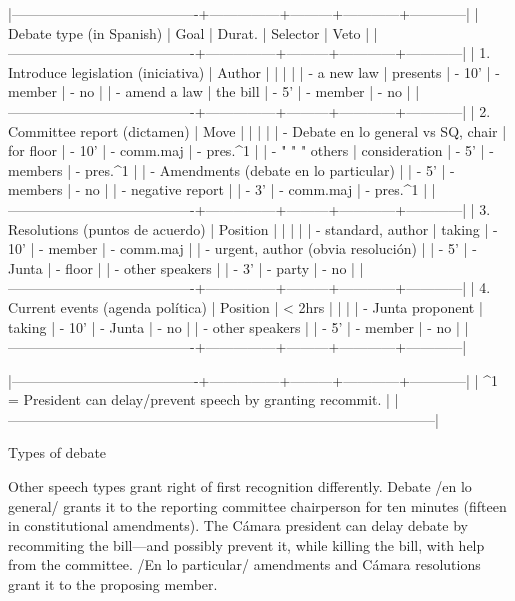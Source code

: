 \begin{table}
|----------------------------------------+---------------+---------+------------+------------|
| Debate type (in Spanish)               | Goal          | Durat.  | Selector   | Veto       |
|----------------------------------------+---------------+---------+------------+------------|
| 1. Introduce legislation (iniciativa)  | Author        |         |            |            |
| - a new law                            | presents      | - 10'   | - member   | - no       |
| - amend a law                          | the bill      | - 5'    | - member   | - no       |
|----------------------------------------+---------------+---------+------------+------------|
| 2. Committee report (dictamen)         | Move          |         |            |            |
| - Debate en lo general vs SQ, chair    | for floor     | - 10'   | - comm.maj | - pres.^1  |
| -   "             "      "   others    | consideration | - 5'    | - members  | - pres.^1  |
| - Amendments (debate en lo particular) |               | - 5'    | - members  | - no       |
| - negative report                      |               | - 3'    | - comm.maj | - pres.^1  |
|----------------------------------------+---------------+---------+------------+------------|
| 3. Resolutions (puntos de acuerdo)     | Position      |         |            |            |
| - standard, author                     | taking        | - 10'   | - member   | - comm.maj |
| - urgent, author (obvia resolución)    |               | - 5'    | - Junta    | - floor    |
| - other speakers                       |               | - 3'    | - party    | - no       |
|----------------------------------------+---------------+---------+------------+------------|
| 4. Current events (agenda política)    | Position      | < 2hrs  |            |            |
| - Junta proponent                      | taking        | - 10'   | - Junta    | - no       |
| - other speakers                       |               | - 5'    | - member   | - no       |
|----------------------------------------+---------------+---------+------------+------------|

|----------------------------------------+---------------+---------+------------+------------|
| ^1 = President can delay/prevent speech by granting recommit.                                |
|--------------------------------------------------------------------------------------------|
\caption{Types of debate}
\end{table}

Other speech types grant right of first recognition differently. Debate /en lo general/ grants it to the reporting committee chairperson for ten minutes (fifteen in constitutional amendments). The Cámara president can delay debate by recommiting the bill---and possibly prevent it, while killing the bill, with help from the committee. /En lo particular/ amendments and Cámara resolutions grant it to the proposing member. 


